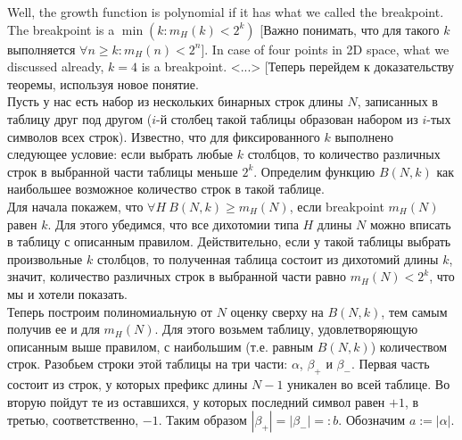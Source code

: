 Well, the growth function is polynomial if it has what we called the breakpoint. The breakpoint is a $\min(k:m_H(k)<2^k)$ [Важно понимать, что для такого $k$ выполняется $\forall n\ge k\colon m_H(n)<2^n$]. In case of four points in 2D space, what we discussed already, $k=4$ is a breakpoint. <...> [Теперь перейдем к доказательству теоремы, используя новое понятие.\\
Пусть у нас есть набор из нескольких бинарных строк длины $N$, записанных в таблицу друг под другом ($i$-й столбец такой таблицы образован набором из $i$-тых символов всех строк). Известно, что для фиксированного $k$ выполнено следующее условие: если выбрать любые $k$ столбцов, то количество различных строк в выбранной части таблицы меньше $2^k$. Определим функцию $B(N,k)$ как наибольшее возможное количество строк в такой таблице.\\
Для начала покажем, что $\forall H\ B(N,k)\ge m_H(N)$, если breakpoint $m_H(N)$ равен $k$. Для этого убедимся, что все дихотомии типа $H$ длины $N$ можно вписать в таблицу с описанным правилом. Действительно, если у такой таблицы выбрать произвольные $k$ столбцов, то полученная таблица состоит из дихотомий длины $k$, значит, количество различных строк в выбранной части равно $m_H(N)<2^k$, что мы и хотели показать.\\
Теперь построим полиномиальную от $N$ оценку сверху на $B(N,k)$, тем самым получив ее и для $m_H(N)$. Для этого возьмем таблицу, удовлетворяющую описанным выше правилом, с наибольшим (т.е. равным $B(N,k)$) количеством строк. Разобьем строки этой таблицы на три части: $\alpha$, $\beta_+$ и $\beta_-$. Первая часть состоит из строк, у которых префикс длины $N-1$ уникален во всей таблице. Во вторую пойдут те из оставшихся, у которых последний символ равен $+1$, в третью, соответственно, $-1$. Таким образом $|\beta_+|=|\beta_-|=:b$. Обозначим $a:=|\alpha|$.\\
